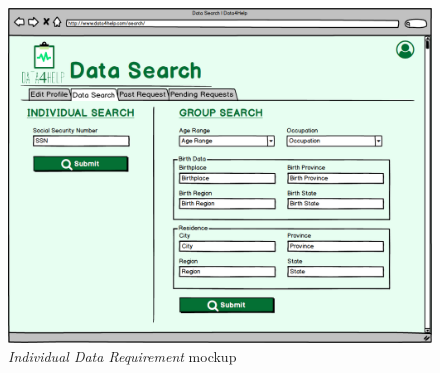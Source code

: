 \begin{figure}[H]
\begin{center}
  \includegraphics[width=\textwidth]{img/mockup/Data_Search.png}
  \hspace{0.05\linewidth}
  \centering
  \caption{\textit{Individual Data Requirement} mockup}
  \label{img:individualDataRequirementMockup}
\end{center}
\end{figure}
